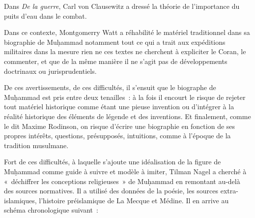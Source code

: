
\label{au-milieu-entre-les-combattants-de-leau-badr-est-le-nom-dun-puits-deau.-pour-muux1e25ammad-il-est-en-cela-un-lieu-stratuxe9gique-dans-la-mesure-ouxf9-la-caravane-devra-sy-arruxeater.}

Dans\textit{ De la guerre}, Carl von Clausewitz a dressé la théorie de
l'importance du puits d'eau dans le combat.

Dans ce contexte, Montgomerry Watt a réhabilité le matériel traditionnel
dans sa biographie de Muḥammad notamment tout ce qui a trait aux
expéditions militaires dans la mesure rien ne ces textes ne cherchent à
expliciter le Coran, le commenter, et que de la même manière il ne
s'agit pas de développements doctrinaux ou jurisprudentiels.

De ces avertissements, de ces difficultés, il s'ensuit que le biographe
de Muḥammad est pris entre deux tenailles~: à la fois il encourt le
risque de rejeter tout matériel historique comme étant une pieuse
invention ou d'intégrer à la réalité historique des éléments de légende
et des inventions. Et finalement, comme le dit Maxime Rodinson, on
risque d'écrire une biographie en fonction de ses propres intérêts,
questions, présupposés, intuitions, comme à l'époque de la tradition
musulmane.

Fort de ces difficultés, à laquelle s'ajoute une idéalisation de la
figure de Muḥammad comme guide à suivre et modèle à imiter, Tilman Nagel
a cherché à «~déchiffrer les conceptions religieuses~» de Muḥammad en
remontant au-delà des sources normatives. Il a utilisé des données de la
poésie, les sources extra-islamiques, l'histoire préislamique de La
Mecque et Médine. Il en arrive au schéma chronologique suivant~:

